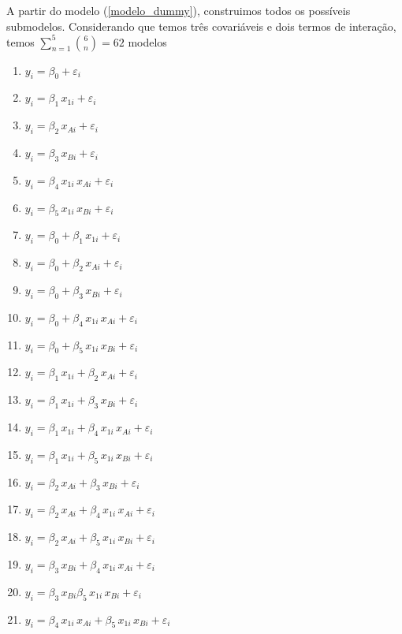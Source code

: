 \documentclass[
  letterpaper,
  DIV=11,
  numbers=noendperiod]{scrartcl}
\begin{document}
A partir do modelo (\ref{modelo_dummy}), construimos todos os possíveis
submodelos. Considerando que temos três covariáveis e dois termos de
interação, temos \(\sum\limits_{n = 1}^5\binom{6}{n} = 62\) modelos

\begin{enumerate}
  \item $y_i = \beta_0 + \varepsilon_i$
  \item $y_i = \beta_1 \, x_{1i} + \varepsilon_i$
  \item $y_i = \beta_2 \, x_{Ai} + \varepsilon_i$
  \item $y_i = \beta_3 \, x_{Bi} + \varepsilon_i$
  \item $y_i = \beta_4 \, x_{1i} \, x_{Ai} + \varepsilon_i$
  \item $y_i = \beta_5 \, x_{1i} \, x_{Bi} + \varepsilon_i$
  
 
  \item $y_i = \beta_0 + \beta_1 \, x_{1i} + \varepsilon_i$
  \item $y_i = \beta_0 + \beta_2 \, x_{Ai} + \varepsilon_i$
  \item $y_i = \beta_0 + \beta_3 \, x_{Bi} + \varepsilon_i$
  \item $y_i = \beta_0 + \beta_4 \, x_{1i} \, x_{Ai} + \varepsilon_i$
  \item $y_i = \beta_0 + \beta_5 \, x_{1i} \, x_{Bi} + \varepsilon_i$
  \item $y_i = \beta_1 \, x_{1i} + \beta_2 \, x_{Ai} + \varepsilon_i$
  \item $y_i = \beta_1 \, x_{1i} + \beta_3 \, x_{Bi} + \varepsilon_i$
  \item $y_i = \beta_1 \, x_{1i} + \beta_4 \, x_{1i} \, x_{Ai} + \varepsilon_i$
  \item $y_i =  \beta_1 \, x_{1i} + \beta_5 \, x_{1i} \, x_{Bi} + \varepsilon_i$
  \item $y_i = \beta_2 \, x_{Ai} + \beta_3 \, x_{Bi}+ \varepsilon_i$
  \item $y_i = \beta_2 \, x_{Ai} + \beta_4 \, x_{1i} \, x_{Ai} + \varepsilon_i$
  \item $y_i = \beta_2 \, x_{Ai} + \beta_5 \, x_{1i} \, x_{Bi} + \varepsilon_i$
  \item $y_i = \beta_3 \, x_{Bi} + \beta_4 \, x_{1i} \, x_{Ai} + \varepsilon_i$
  \item $y_i = \beta_3 \, x_{Bi} \beta_5 \, x_{1i} \, x_{Bi} + \varepsilon_i$
  \item $y_i = \beta_4 \, x_{1i} \, x_{Ai} + \beta_5 \, x_{1i} \, x_{Bi} + \varepsilon_i$
  

\end{enumerate}
\end{document}
